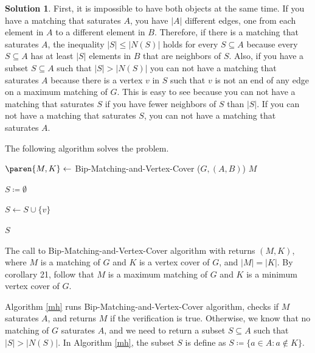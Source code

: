 \documentclass[11pt,leqno,final]{amsart}
\theoremstyle{definition}
\newtheorem{solution}{Solution}
\begin{document}
\begin{solution}
  First, it is impossible to have both objects at the same time. If you have a matching that saturates $A$, you have $|A|$ different edges, one from each element in $A$ to a different element in $B$. Therefore, if there is a matching that saturates $A$, the inequality $|S| \leq |N (S)|$ holds for every $S \subseteq A$ because every $S \subseteq A$ has at least $|S|$ elements in $B$ that are neighbors of $S$. Also, if you have a subset $S \subseteq A$ such that $|S| > |N (S)|$ you can not have a matching that saturates $A$ because there is a vertex $v$ in $S$ such that $v$ is not an end of any edge on a maximum matching of $G$. This is easy to see because you can not have a matching that saturates $S$ if you have fewer neighbors of $S$ than $|S|$. If you can not have a matching that saturates $S$, you can not have a matching that saturates $A$.  
  
  The following algorithm solves the problem.

  
  \begin{algorithm}
    \caption{Matching-or-Hall-Set ($G, (A, B)$)}\label{mh}
    \begin{algorithmic}[1]
      \State $\paren{M,K} \gets$ Bip-Matching-and-Vertex-Cover ($G,(A,B)$)
        \State \Return $M$ 
      \EndIf

      \State $S \coloneqq \emptyset$

          \State $S \gets S \cup \{v\}$ 

        \EndIf
      \EndFor
      \State \Return $S$

    \end{algorithmic}
  \end{algorithm}

   The call to Bip-Matching-and-Vertex-Cover algorithm with returns $(M,K)$, where $M$ is a matching of $G$ and $K$ is a vertex cover of $G$, and $|M| = |K|$. By corollary 21, follow that $M$ is a maximum matching of $G$ and $K$ is a minimum vertex cover of $G$.

  Algorithm \ref{mh} runs Bip-Matching-and-Vertex-Cover algorithm, checks if $M$ saturates $A$, and returns $M$ if the verification is true. Otherwise, we know that no matching of $G$ saturates $A$, and we need to return a subset $S \subseteq A$ such that $|S| > |N (S)|$. In Algorithm \ref{mh}, the subset $S$ is define as $S \coloneqq \{a \in A: a \notin K\}$.
  

\end{solution}
\end{document}

